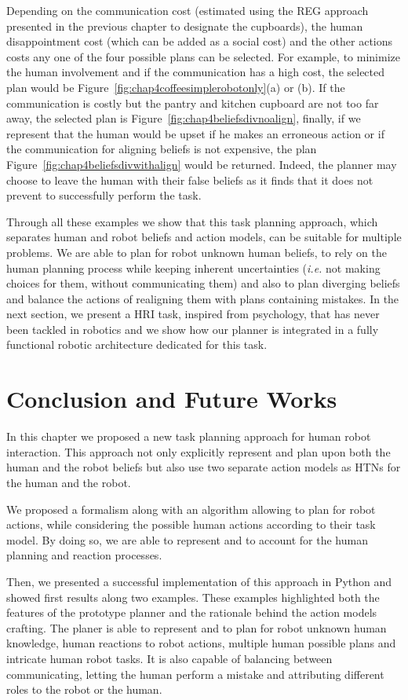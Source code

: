 \documentclass[a4paper,11pt,twoside]{StyleThese}
\begin{document}
Depending on the communication cost (estimated using the REG approach presented in the previous chapter to designate the cupboards), the human disappointment cost (which can be added as a social cost) and the other actions costs any one of the four possible plans can be selected. For example, to minimize the human involvement and if the communication has a high cost, the selected plan would be Figure~\ref{fig:chap4coffeesimplerobotonly}(a) or (b). If the communication is costly but the pantry and kitchen cupboard are not too far away, the selected plan is Figure~\ref{fig:chap4beliefsdivnoalign}, finally, if we represent that the human would be upset if he makes an erroneous action or if the communication for aligning beliefs is not expensive, the plan Figure~\ref{fig:chap4beliefsdivwithalign} would be returned.
Indeed, the planner may choose to leave the human with their false beliefs as it finds that it does not prevent to successfully perform the task. 

Through all these examples we show that this task planning approach, which separates human and robot beliefs and action models, can be suitable for multiple problems. We are able to plan for robot unknown human beliefs, to rely on the human planning process while keeping inherent uncertainties (\textit{i.e.} not making choices for them, without communicating them) and also to plan diverging beliefs and balance the actions of realigning them with plans containing mistakes. In the next section, we present a HRI task, inspired from psychology, that has never been tackled in robotics and we show how our planner is integrated in a fully functional robotic architecture dedicated for this task.

\section{Conclusion and Future Works}
In this chapter we proposed a new task planning approach for human robot interaction. This approach not only explicitly represent and plan upon both the human and the robot beliefs but also use two separate action models as HTNs for the human and the robot.

We proposed a formalism along with an algorithm allowing to plan for robot actions, while considering the possible human actions according to their task model. By doing so, we are able to represent and to account for the human planning and reaction processes.

Then, we presented a successful implementation of this approach in Python and showed first results along two examples. These examples highlighted both the features of the prototype planner and the rationale behind the action models crafting. The planer is able to represent and to plan for robot unknown human knowledge, human reactions to robot actions, multiple human possible plans and intricate human robot tasks. It is also capable of balancing between communicating, letting the human perform a mistake and attributing different roles to the robot or the human.
\end{document}
